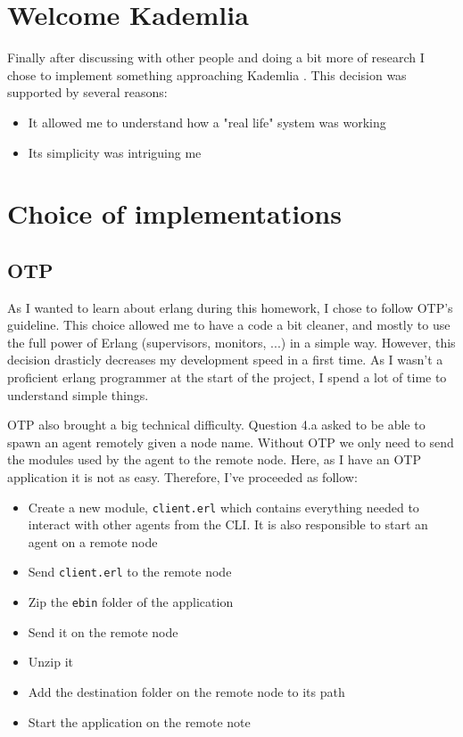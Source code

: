 \documentclass[a4paper]{article}
\begin{document}
\section{Welcome Kademlia}

Finally after discussing with other people and doing a bit more of research I chose to implement something approaching Kademlia \cite{maymounkov2002kademlia}. This decision was supported by several reasons:
\begin{itemize}
    \item It allowed me to understand how a "real life" system was working
    \item Its simplicity was intriguing me
\end{itemize}

\section{Choice of implementations}

\subsection{OTP}

As I wanted to learn about erlang during this homework, I chose to follow OTP's guideline. This choice allowed me to have a code a bit cleaner, and mostly to use the full power of Erlang (supervisors, monitors, ...) in a simple way.
However, this decision drasticly decreases my development speed in a first time. As I wasn't a proficient erlang programmer at the start of the project, I spend a lot of time to understand simple things.

OTP also brought a big technical difficulty. Question 4.a asked to be able to spawn an agent remotely given a node name. Without OTP we only need to send the modules used by the agent to the remote node. Here, as I have an OTP application it is not as easy. Therefore, I've proceeded as follow:
\begin{itemize}
    \item Create a new module, \verb|client.erl| which contains everything needed to interact with other agents from the CLI. It is also responsible to start an agent on a remote node
    \item Send \verb|client.erl| to the remote node
    \item Zip the \verb|ebin| folder of the application
    \item Send it on the remote node
    \item Unzip it
    \item Add the destination folder on the remote node to its path
    \item Start the application on the remote note
\end{itemize}
\end{document}
